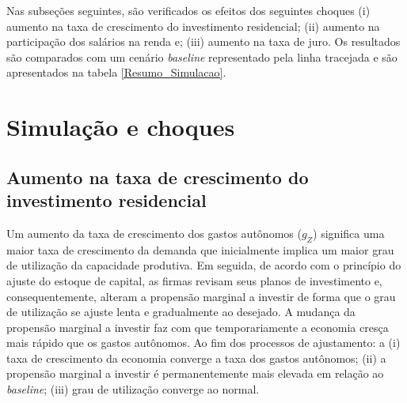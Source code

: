 Nas subseções seguintes, são verificados os efeitos dos seguintes choques
(i) aumento na taxa de crescimento do investimento residencial; (ii) aumento na participação dos salários na renda e; (iii) aumento na taxa de juro. Os resultados são comparados com um cenário \textit{baseline} representado pela linha tracejada e são apresentados na tabela \ref{Resumo_Simulacao}.

\section{Simulação e choques}

\subsection{Aumento na taxa de crescimento do investimento residencial}


Um aumento da taxa de crescimento dos gastos autônomos ($g_Z$) significa uma maior taxa de crescimento da demanda que inicialmente implica um maior grau de utilização da capacidade produtiva. Em seguida, de acordo com o princípio do ajuste do estoque de capital, as firmas revisam seus planos de investimento e, consequentemente, alteram a propensão marginal a investir de forma que o grau de utilização se ajuste lenta e gradualmente ao desejado. A mudança da propensão marginal a investir faz com que temporariamente a economia cresça mais rápido que os gastos autônomos. Ao fim dos processos de ajustamento: a (i) taxa de crescimento da economia converge a taxa dos gastos autônomos; (ii) a propensão marginal a investir é permanentemente mais elevada em relação ao \textit{baseline}; (iii) grau de utilização converge ao normal.



